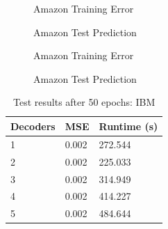 \documentclass{article}
\begin{document}
    \begin{figure}[H]
      \centering
      \begin{minipage}[b]{0.4	\textwidth}
        \caption{Amazon Training Error}
      \end{minipage}
      \hfill
      \begin{minipage}[b]{0.4	\textwidth}
        \caption{Amazon Test Prediction}
      \end{minipage}
    \end{figure}
    \begin{figure}[H]
      \centering
      \begin{minipage}[b]{0.4	\textwidth}
        \caption{Amazon Training Error}
      \end{minipage}
      \hfill
      \begin{minipage}[b]{0.4	\textwidth}
        \caption{Amazon Test Prediction}
      \end{minipage}
    \end{figure}
    \begin{table}[H]
      \caption{Test results after 50 epochs: IBM}
      \centering
      \begin{tabular}{lll}
        \toprule
        Decoders     & MSE     & Runtime (s) \\
        \midrule
	 1 & 0.002 & 272.544 \\
	 2 & 0.002 & 225.033 \\
	 3 & 0.002 & 314.949 \\
	 4 & 0.002 & 414.227 \\
	 5 & 0.002 & 484.644 \\
      \bottomrule
      \end{tabular}
    \end{table}
\end{document}
